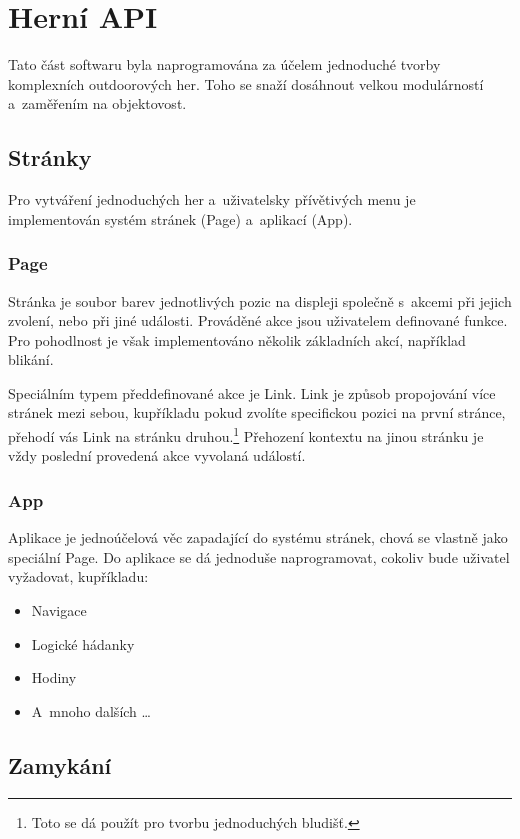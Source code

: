 \chapter{Herní API}
Tato část softwaru byla naprogramována za účelem jednoduché tvorby komplexních outdoorových her.
Toho se snaží dosáhnout velkou modulárností a~zaměřením na objektovost.

\section{Stránky}

Pro vytváření jednoduchých her a~uživatelsky přívětivých menu je implementován systém stránek (Page) a~aplikací (App).

\subsection{Page}

Stránka je soubor barev jednotlivých pozic na displeji společně s~akcemi při jejich zvolení, nebo při jiné události.
Prováděné akce jsou uživatelem definované funkce.
Pro pohodlnost je však implementováno několik základních akcí, například blikání.

Speciálním typem předdefinované akce je Link.
Link je způsob propojování více stránek mezi sebou, kupříkladu pokud zvolíte specifickou pozici na první stránce, přehodí vás Link na stránku druhou.\footnote{Toto se dá použít pro tvorbu jednoduchých bludišť.}
Přehození kontextu na jinou stránku je vždy poslední provedená akce vyvolaná událostí.

\subsection{App}

Aplikace je jednoúčelová věc zapadající do systému stránek, chová se vlastně jako speciální Page.
Do aplikace se dá jednoduše naprogramovat, cokoliv bude uživatel vyžadovat, kupříkladu:
\begin{itemize}
    \item Navigace
    \item Logické hádanky
    \item Hodiny
    \item A~mnoho dalších \dots
\end{itemize}

\section{Zamykání}

